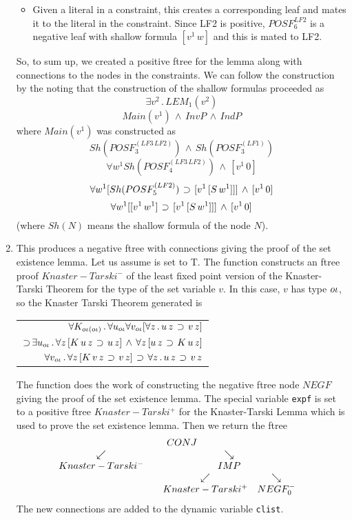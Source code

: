 \begin{enumerate}
\begin{itemize}
\item {\bf {}}  Given a literal in
a constraint, this creates a corresponding leaf and mates it to the literal
in the constraint.  Since LF2 is positive, $POSF_6^{LF2}$ is a negative leaf
with shallow formula $[v^1\, w]$ and this is mated to LF2.
\end{itemize}

So, to sum up, we created a positive ftree for the lemma along with
connections to the nodes in the constraints.  We can follow the construction
by the noting that the construction of the shallow formulas proceeded
as
$$\exists v^2\,.\, LEM_1(v^2)$$
$$Main(v^1)\,\land\, InvP\,\land\, IndP$$
where $Main(v^1)$ was constructed as
$$Sh(POSF_3^{(LF3\, LF2)})\, \land \, Sh(POSF_3^{(LF1)})$$
$$\forall w^1 Sh(POSF_4^{(LF3\, LF2)})\, \land \, [v^1\, 0]$$
$$\forall w^1 [Sh(POSF_5^{(LF2)})\,\mathbin{\supset}\, [v^1\, [S\, w^1]]]\, \land \, [v^1\, 0]$$
$$\forall w^1 [[v^1\, w^1]\,\mathbin{\supset}\, [v^1\, [S\, w^1]]]\, \land \, [v^1\, 0]$$
(where $Sh(N)$ means the shallow formula of the node $N$).

\item {\bf {}}  This produces
a negative ftree with connections giving the proof of the set existence lemma.
Let us assume  is set to T.
The function  constructs
an ftree proof $Knaster-Tarski^-$ of the least fixed point version of the
Knaster-Tarski Theorem for the type of the set variable $v$.
In this case, $v$ has type $o\iota$, so the Knaster Tarski Theorem
generated is \
\begin{center}
\begin{tabular}{r}
$\forall K_{o\iota(o\iota)} \, . \,
\forall u_{o\iota}\forall v_{o\iota} 
[\forall z \, . \, u\, z \,\mathbin{\supset}\, v\, z]$ \\
$\mathbin{\supset}\, \exists u_{o\iota} \, . \, \forall z\, [K\, u\, z\, \mathbin{\supset} \, u\, z]
\,\land \,\forall z\, [u\, z\, \mathbin{\supset} \, K \, u\, z]$ \\
$\forall v_{o\iota}\, . \, \forall z\, [K\, v\, z\, \mathbin{\supset} \, v\, z]
\,\mathbin{\supset}\, \forall z\, .\, u\, z\, \mathbin{\supset} \, v\, z$ \\
\end{tabular}
\end{center}
The function 
does the work of constructing the negative ftree node $NEGF$ giving
the proof of the set existence lemma.  The special variable
\verb+expf+ is set to a positive ftree $Knaster-Tarski^+$ for the Knaster-Tarski
Lemma which is used to prove the set existence lemma.
Then we return the ftree
$${{\begin{array}[t]{c}CONJ \\ \begin{array}[t]{cc} \swarrow & \searrow \\ Knaster-Tarski^- & {{\begin{array}[t]{c}IMP \\ \begin{array}[t]{cc} \swarrow & \searrow \\ Knaster-Tarski^+ & NEGF_0^- \end{array}\end{array}}} \end{array}\end{array}}}$$
The new connections are added to the dynamic variable \verb+clist+.


\end{enumerate}
